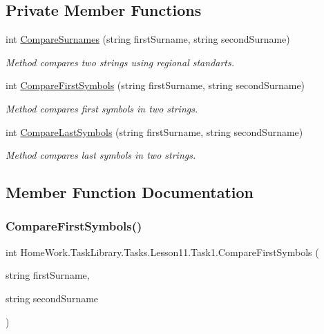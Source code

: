 \subsection*{Private Member Functions}
\begin{DoxyCompactItemize}
\item 
int \mbox{\hyperlink{class_home_work_1_1_task_library_1_1_tasks_1_1_lesson11_1_1_task1_ac62a01c5dce93804a5a785f1b7ecab57}{Compare\+Surnames}} (string first\+Surname, string second\+Surname)
\begin{DoxyCompactList}\small\item\em Method compares two strings using regional standarts. \end{DoxyCompactList}\item 
int \mbox{\hyperlink{class_home_work_1_1_task_library_1_1_tasks_1_1_lesson11_1_1_task1_a29f4ccccdd75398374616731d5113863}{Compare\+First\+Symbols}} (string first\+Surname, string second\+Surname)
\begin{DoxyCompactList}\small\item\em Method compares first symbols in two strings. \end{DoxyCompactList}\item 
int \mbox{\hyperlink{class_home_work_1_1_task_library_1_1_tasks_1_1_lesson11_1_1_task1_a7213794b9fd45551fe75d58fd6ac9a02}{Compare\+Last\+Symbols}} (string first\+Surname, string second\+Surname)
\begin{DoxyCompactList}\small\item\em Method compares last symbols in two strings. \end{DoxyCompactList}\end{DoxyCompactItemize}


\subsection{Member Function Documentation}
\mbox{\label{class_home_work_1_1_task_library_1_1_tasks_1_1_lesson11_1_1_task1_a29f4ccccdd75398374616731d5113863}} 
\subsubsection{\texorpdfstring{CompareFirstSymbols()}{CompareFirstSymbols()}}
{\footnotesize\ttfamily int Home\+Work.\+Task\+Library.\+Tasks.\+Lesson11.\+Task1.\+Compare\+First\+Symbols (\begin{DoxyParamCaption}\item[{string}]{first\+Surname,  }\item[{string}]{second\+Surname }\end{DoxyParamCaption})\hspace{0.3cm}{\ttfamily [private]}}



